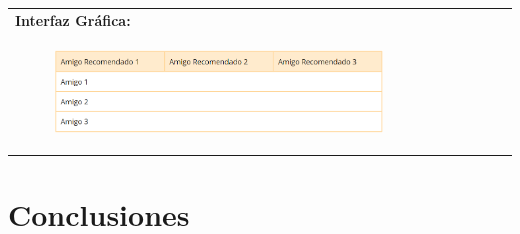 \documentclass{report}
\begin{document}
\begin{center}
\begin{longtable}{|p{\linewidth}|}
                    \hline
                    \textbf{Interfaz Gráfica:}\\
                    \begin{figure}[H]
                        \centering
                        \includegraphics[width=0.8\textwidth]{./img/grafico/IU Recomendaciones de amigos.PNG}
                    \end{figure}\\
                    \hline
                \end{longtable}
            \end{center}
        \clearpage
    \chapter{Conclusiones} 
\end{document}
